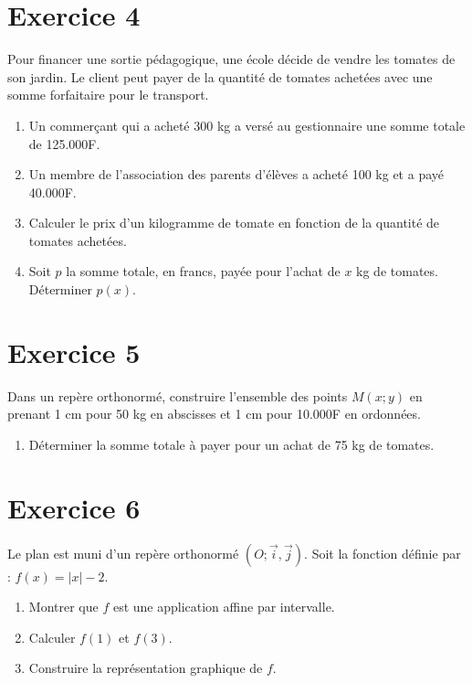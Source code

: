 \documentclass[12pt,a4paper]{article}
\begin{document}
\begin{multicols}{2}
\section*{Exercice 4}
Pour financer une sortie pédagogique, une école décide de vendre les tomates de son jardin. Le client peut payer de la quantité de tomates achetées avec une somme forfaitaire pour le transport.
\begin{enumerate}
    \item Un commerçant qui a acheté 300 kg a versé au gestionnaire une somme totale de 125.000F.
    \item Un membre de l'association des parents d'élèves a acheté 100 kg et a payé 40.000F.
    \item Calculer le prix d'un kilogramme de tomate en fonction de la quantité de tomates achetées.
    \item Soit $p$ la somme totale, en francs, payée pour l'achat de $x$ kg de tomates. Déterminer $p(x)$.
\end{enumerate}

\section*{Exercice 5}
Dans un repère orthonormé, construire l'ensemble des points $M(x; y)$ en prenant 1 cm pour 50 kg en abscisses et 1 cm pour 10.000F en ordonnées.
\begin{enumerate}
    \item Déterminer la somme totale à payer pour un achat de 75 kg de tomates.
\end{enumerate}

\section*{Exercice 6}
Le plan est muni d’un repère orthonormé $(O ; \vec{i}, \vec{j})$. Soit la fonction définie par : $f(x) = |x| - 2$.
\begin{enumerate}
    \item Montrer que $f$ est une application affine par intervalle.
    \item Calculer $f(1)$ et $f(3)$.
    \item Construire la représentation graphique de $f$.
\end{enumerate}


\end{multicols}
\end{document}
